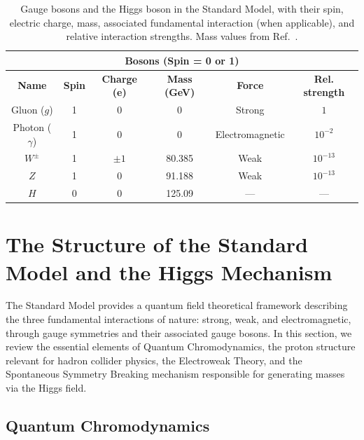 \begin{table}[htbp]
\centering
\small
\renewcommand{\arraystretch}{1.2}
\setlength{\tabcolsep}{6pt}
\begin{tabular}{cccccc}
\multicolumn{6}{c}{\textbf{Bosons (Spin = 0 or 1)}} \\
\toprule
\textbf{Name} & \textbf{Spin} & \textbf{Charge (e)} & \textbf{Mass (GeV)} & \textbf{Force} & \textbf{Rel. strength} \\
\midrule
Gluon ($g$)     & 1 & 0        & 0       & Strong         & $1$ \\
Photon ($\gamma$) & 1 & 0        & 0       & Electromagnetic & $10^{-2}$ \\
$W^{\pm}$       & 1 & $\pm 1$  & 80.385  & Weak           & $10^{-13}$ \\
$Z$             & 1 & 0        & 91.188  & Weak           & $10^{-13}$ \\
$H$             & 0 & 0        & 125.09  & —              & — \\
\bottomrule
\end{tabular}
\caption{Gauge bosons and the Higgs boson in the Standard Model, with their spin, electric charge, mass, associated fundamental interaction (when applicable), and relative interaction strengths. Mass values from Ref.~\cite{ParticleDataGroup}.}
\label{tab:bosons}
\end{table}



\section{The Structure of the Standard Model and the Higgs Mechanism}
\label{sec:sm_higgs_mech}


The Standard Model provides a quantum field theoretical framework describing the three fundamental interactions of nature: strong, weak, and electromagnetic, through gauge symmetries and their associated gauge bosons. In this section, we review the essential elements of Quantum Chromodynamics, the proton structure relevant for hadron collider physics, the Electroweak Theory, and the Spontaneous Symmetry Breaking mechanism responsible for generating masses via the Higgs field.


\subsection{Quantum Chromodynamics}
\label{subsec:QCD}

